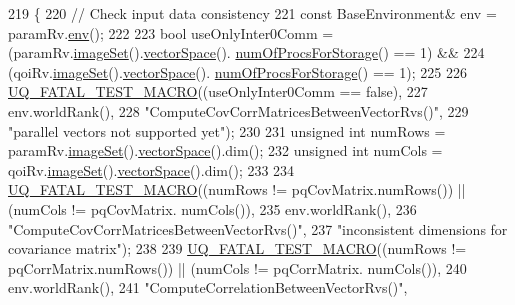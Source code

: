 \begin{DoxyCode}
219 \{
220   \textcolor{comment}{// Check input data consistency}
221   \textcolor{keyword}{const} BaseEnvironment& env = paramRv.\hyperlink{class_q_u_e_s_o_1_1_base_vector_r_v_ad5bf8486b3bacb46b9d4ecba513fd37b}{env}();
222 
223   \textcolor{keywordtype}{bool} useOnlyInter0Comm = (paramRv.\hyperlink{class_q_u_e_s_o_1_1_base_vector_r_v_aa4dd2f036228eac1f945bacc7147a922}{imageSet}().\hyperlink{class_q_u_e_s_o_1_1_vector_set_a923421590baf5bf93cf066e528f927dc}{vectorSpace}().
      \hyperlink{class_q_u_e_s_o_1_1_vector_space_a67b0c3620662116f5a346fdaa5faf38e}{numOfProcsForStorage}() == 1) &&
224                            (qoiRv.\hyperlink{class_q_u_e_s_o_1_1_base_vector_r_v_aa4dd2f036228eac1f945bacc7147a922}{imageSet}().\hyperlink{class_q_u_e_s_o_1_1_vector_set_a923421590baf5bf93cf066e528f927dc}{vectorSpace}().
      \hyperlink{class_q_u_e_s_o_1_1_vector_space_a67b0c3620662116f5a346fdaa5faf38e}{numOfProcsForStorage}()   == 1);
225 
226   \hyperlink{_defines_8h_a56d63d18d0a6d45757de47fcc06f574d}{UQ\_FATAL\_TEST\_MACRO}((useOnlyInter0Comm == \textcolor{keyword}{false}),
227                       env.worldRank(),
228                       \textcolor{stringliteral}{"ComputeCovCorrMatricesBetweenVectorRvs()"},
229                       \textcolor{stringliteral}{"parallel vectors not supported yet"});
230 
231   \textcolor{keywordtype}{unsigned} \textcolor{keywordtype}{int} numRows = paramRv.\hyperlink{class_q_u_e_s_o_1_1_base_vector_r_v_aa4dd2f036228eac1f945bacc7147a922}{imageSet}().\hyperlink{class_q_u_e_s_o_1_1_vector_set_a923421590baf5bf93cf066e528f927dc}{vectorSpace}().dim();
232   \textcolor{keywordtype}{unsigned} \textcolor{keywordtype}{int} numCols = qoiRv.\hyperlink{class_q_u_e_s_o_1_1_base_vector_r_v_aa4dd2f036228eac1f945bacc7147a922}{imageSet}().\hyperlink{class_q_u_e_s_o_1_1_vector_set_a923421590baf5bf93cf066e528f927dc}{vectorSpace}().dim();
233 
234   \hyperlink{_defines_8h_a56d63d18d0a6d45757de47fcc06f574d}{UQ\_FATAL\_TEST\_MACRO}((numRows != pqCovMatrix.numRows()) || (numCols != pqCovMatrix.
      numCols()),
235                       env.worldRank(),
236                       \textcolor{stringliteral}{"ComputeCovCorrMatricesBetweenVectorRvs()"},
237                       \textcolor{stringliteral}{"inconsistent dimensions for covariance matrix"});
238 
239   \hyperlink{_defines_8h_a56d63d18d0a6d45757de47fcc06f574d}{UQ\_FATAL\_TEST\_MACRO}((numRows != pqCorrMatrix.numRows()) || (numCols != pqCorrMatrix.
      numCols()),
240                       env.worldRank(),
241                       \textcolor{stringliteral}{"ComputeCorrelationBetweenVectorRvs()"},

\end{DoxyCode}
